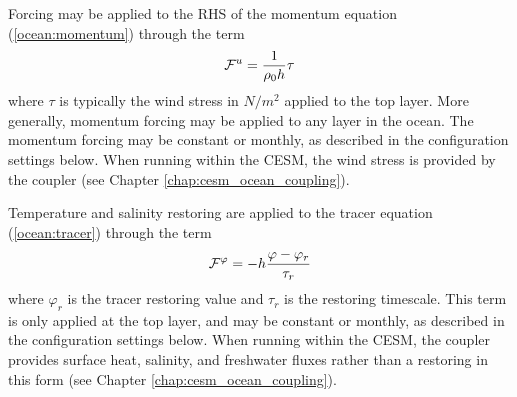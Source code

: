 Forcing may be applied to the RHS of the momentum equation (\ref{ocean:momentum}) through the term 
\begin{equation}
{\cal F}^u = \frac{1}{\rho_0 h}\tau \label{ocean:\mode_mom_surf_forcing}
\end{equation}
where $\tau$ is typically the wind stress in $N/m^2$ applied to the top layer.  More generally, momentum forcing may be applied to any layer in the ocean.  The momentum forcing may be constant or monthly, as described in the configuration settings below.  When running within the CESM, the wind stress is provided by the coupler (see Chapter \ref{chap:cesm_ocean_coupling}).

Temperature and salinity restoring are applied to the tracer equation (\ref{ocean:tracer}) through the term
\begin{equation}
{\cal F}^\varphi = -h\frac{\varphi-\varphi_{r}}{\tau_{r}}
\end{equation}
where $\varphi_{r}$ is the tracer restoring value and $\tau_{r}$ is the restoring timescale.  This term is only applied at the top layer, and may be constant or monthly, as described in the configuration settings below.  When running within the CESM, the coupler provides surface heat, salinity, and freshwater fluxes rather than a restoring in this form (see Chapter \ref{chap:cesm_ocean_coupling}).
